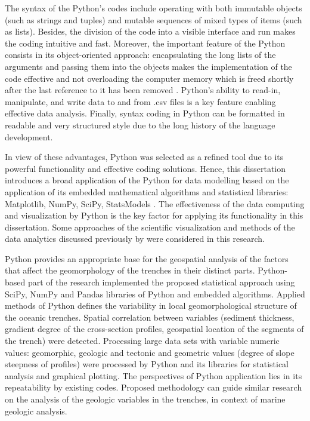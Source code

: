 \documentclass[11pt,a4paper]{report}
\begin{document}
{The syntax of the Python’s codes include operating with both immutable objects (such as strings and tuples) and mutable sequences of mixed types of items (such as lists). Besides, the division of the code into a visible interface and run makes the coding intuitive and fast. Moreover, the important feature of the Python consists in its object-oriented approach: encapsulating the long lists of the arguments and passing them into the objects makes the implementation of the code effective and not overloading the computer memory which is freed shortly after the last reference to it has been removed \cite{Lemenkova202010}. Python’s ability to read-in, manipulate, and write data to and from .csv files is a key feature enabling effective data analysis. Finally, syntax coding in Python can be formatted in readable and very structured style due to the long history of the language development. 

In view of these advantages, Python was selected as a refined tool due to its powerful functionality and effective coding solutions. Hence, this dissertation introduces a broad application of the Python for data modelling based on the application of its embedded mathematical algorithms and statistical libraries: Matplotlib, \ac{NumPy}, \ac{SciPy}, \ac{StatsModels} \cite{Lemenkova202010}. The effectiveness of the data computing and visualization by Python is the key factor for applying its functionality in this dissertation. Some approaches of the scientific visualization and methods of the data analytics discussed previously by \cite{Crameri2018} were considered in this research. 
 
Python provides an appropriate base for the geospatial analysis of the factors that affect the geomorphology of the trenches in their distinct parts. Python-based part of the research implemented the proposed statistical approach using \ac{SciPy}, \ac{NumPy} and Pandas libraries of Python and embedded algorithms. Applied methods of Python defines the variability in local geomorphological structure of the oceanic trenches. Spatial correlation between variables (sediment thickness, gradient degree of the cross-section profiles, geospatial location of the segments of the trench) were detected. Processing large data sets with variable numeric values: geomorphic, geologic and tectonic and geometric values (degree of slope steepness of profiles) were processed by Python and its libraries for statistical analysis and graphical plotting. The perspectives of Python application lies in its repeatability by existing codes. Proposed methodology can guide similar research on the analysis of the geologic variables in the trenches, in context of marine geologic analysis. 
	 
}
\end{document}
